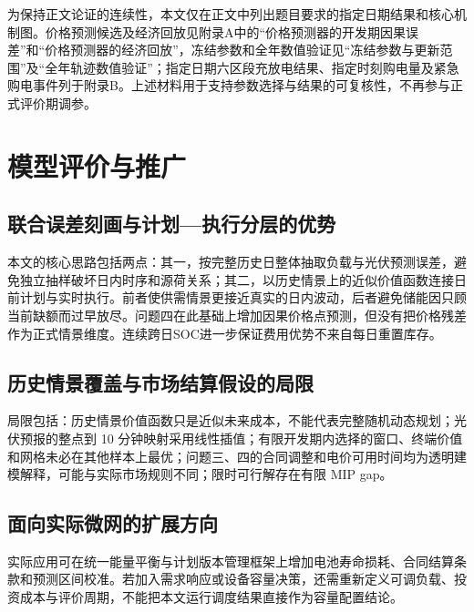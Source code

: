 \documentclass[zihao=-4,a4paper,UTF8,fontset=none]{ctexart}
\begin{document}
为保持正文论证的连续性，本文仅在正文中列出题目要求的指定日期结果和核心机制图。价格预测候选及经济回放见附录A中的``价格预测器的开发期因果误差''和``价格预测器的经济回放''，冻结参数和全年数值验证见``冻结参数与更新范围''及``全年轨迹数值验证''；指定日期六区段充放电结果、指定时刻购电量及紧急购电事件列于附录B。上述材料用于支持参数选择与结果的可复核性，不再参与正式评价期调参。

\section{模型评价与推广}\label{ux6a21ux578bux8bc4ux4ef7ux4e0eux63a8ux5e7f}

\subsection{联合误差刻画与计划---执行分层的优势}\label{ux8054ux5408ux8befux5deeux523bux753bux4e0eux8ba1ux5212ux6267ux884cux5206ux5c42ux7684ux4f18ux52bf}

本文的核心思路包括两点：其一，按完整历史日整体抽取负载与光伏预测误差，避免独立抽样破坏日内时序和源荷关系；其二，以历史情景上的近似价值函数连接日前计划与实时执行。前者使供需情景更接近真实的日内波动，后者避免储能因只顾当前缺额而过早放尽。问题四在此基础上增加因果价格点预测，但没有把价格残差作为正式情景维度。连续跨日SOC进一步保证费用优势不来自每日重置库存。

\subsection{历史情景覆盖与市场结算假设的局限}\label{ux5386ux53f2ux60c5ux666fux8986ux76d6ux4e0eux5e02ux573aux7ed3ux7b97ux5047ux8bbeux7684ux5c40ux9650}

局限包括：历史情景价值函数只是近似未来成本，不能代表完整随机动态规划；光伏预报的整点到 10 分钟映射采用线性插值；有限开发期内选择的窗口、终端价值和网格未必在其他样本上最优；问题三、四的合同调整和电价可用时间均为透明建模解释，可能与实际市场规则不同；限时可行解存在有限 MIP gap。

\subsection{面向实际微网的扩展方向}\label{ux9762ux5411ux5b9eux9645ux5faeux7f51ux7684ux6269ux5c55ux65b9ux5411}

实际应用可在统一能量平衡与计划版本管理框架上增加电池寿命损耗、合同结算条款和预测区间校准。若加入需求响应或设备容量决策，还需重新定义可调负载、投资成本与评价周期，不能把本文运行调度结果直接作为容量配置结论。
\end{document}
